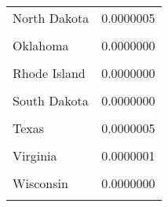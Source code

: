 \begin{table}[H]
\begin{tabular}[t]{lr}
North Dakota & 0.0000005\\
\cellcolor{gray!6}{Ohio} & \cellcolor{gray!6}{0.0000000}\\
Oklahoma & 0.0000000\\
\addlinespace
\cellcolor{gray!6}{Pennsylvania} & \cellcolor{gray!6}{0.0000000}\\
Rhode Island & 0.0000000\\
\cellcolor{gray!6}{South Carolina} & \cellcolor{gray!6}{0.0000000}\\
South Dakota & 0.0000000\\
\cellcolor{gray!6}{Tennessee} & \cellcolor{gray!6}{0.0000000}\\
\addlinespace
Texas & 0.0000005\\
\cellcolor{gray!6}{Utah} & \cellcolor{gray!6}{0.0760580}\\
Virginia & 0.0000001\\
\cellcolor{gray!6}{West Virginia} & \cellcolor{gray!6}{0.0000000}\\
Wisconsin & 0.0000000\\
\addlinespace
\cellcolor{gray!6}{Wyoming} & \cellcolor{gray!6}{0.0000000}\\
\bottomrule
\end{tabular}
\end{table}
